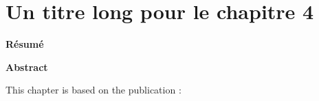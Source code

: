 \ifdefined{}
\else
\setcounter{chapter}{3} %
\dominitoc
\faketableofcontents
\fi

\chapter{Un titre long pour le chapitre 4}
\label{chap:4}


\textbf{Résumé}

\textbf{Abstract}

\begin{cit}
    This chapter is based on the publication \cite{}:
\end{cit}


\clearpage
\minitoc

